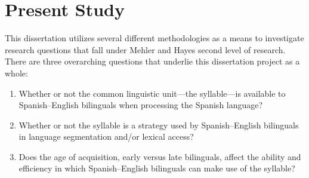
\section{Present Study}

This dissertation utilizes several different methodologies as a means to investigate research questions that fall under Mehler and Hayes \parencite*{Mehler1981-wp} second level of research. There are three overarching questions that underlie this dissertation project as a whole:
\begin{enumerate}
\item Whether or not the common linguistic unit—the syllable—is available to Spanish–English bilinguals when processing the Spanish language?
\item Whether or not the syllable is a strategy used by Spanish–English bilinguals in language segmentation and/or lexical access?
\item Does the age of acquisition, early versus late bilinguals, affect the ability and efficiency in which Spanish–English bilinguals can make use of the syllable?
\end{enumerate}


